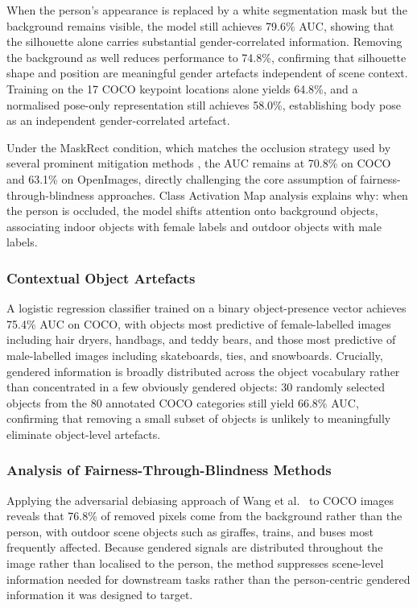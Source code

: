 When the person's appearance is replaced by a white segmentation mask but the background
remains visible, the model still achieves 79.6\% AUC, showing that the silhouette alone carries substantial gender-correlated information.
Removing the background as well reduces performance to 74.8\%, confirming that silhouette
shape and position are meaningful gender artefacts independent of scene context. Training
on the 17 COCO keypoint locations alone yields 64.8\%, and a normalised pose-only
representation still achieves 58.0\%, establishing body pose as an independent gender-correlated artefact.

Under the MaskRect condition, which matches the occlusion strategy used by several
prominent mitigation methods \cite{Burns_2018_WomenAlsoSnowboard,
	Wang_2019_BalancedDatasetsNotEnough}, the AUC remains at 70.8\% on COCO and 63.1\% on
OpenImages, directly challenging the core assumption of fairness-through-blindness approaches.
Class Activation Map analysis explains why: when the person is occluded, the
model shifts attention onto background objects, associating indoor objects with female
labels and outdoor objects with male labels.

\subsubsection*{Contextual Object Artefacts}
\label{subsubsec:meister_objects}

A logistic regression classifier trained on a binary object-presence vector achieves 75.4\%
AUC on COCO, with objects most predictive of female-labelled images including hair dryers,
handbags, and teddy bears, and those most predictive of male-labelled images including
skateboards, ties, and snowboards. Crucially, gendered information is broadly distributed across the object vocabulary rather than concentrated in a few obviously gendered objects:
30 randomly selected objects from the 80 annotated COCO categories still yield 66.8\% AUC,
confirming that removing a small subset of objects is unlikely to meaningfully eliminate object-level
artefacts.

\subsubsection*{Analysis of Fairness-Through-Blindness Methods}
\label{subsubsec:meister_ftb}

Applying the adversarial debiasing approach of Wang et
al.~\cite{Wang_2019_BalancedDatasetsNotEnough} to COCO images reveals that 76.8\% of
removed pixels come from the background rather than the person, with outdoor scene objects
such as giraffes, trains, and buses most frequently affected. Because gendered signals are distributed throughout the image rather than localised to the
person, the method suppresses scene-level information needed for downstream tasks rather than the
person-centric gendered information it was designed to target.

